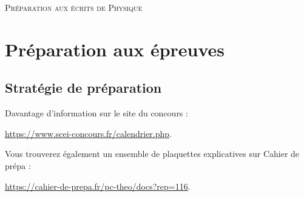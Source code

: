 \documentclass[12pt,fancy]{cours}
\begin{document}
\begin{center}
  \Large
  \color{structurecolor}
  \textsc{Préparation aux écrits de Physique}
\end{center}

%

\section{Préparation aux épreuves}

\subsection{Stratégie de préparation}

Davantage d'information sur le site du concours : 
\begin{center}
  \href{https://www.scei-concours.fr/calendrier.php}{https://www.scei-concours.fr/calendrier.php}.
\end{center}
Vous trouverez également un ensemble de plaquettes explicatives sur Cahier de prépa :
\begin{center}
  \href{https://cahier-de-prepa.fr/pc-theo/docs?rep=116}{https://cahier-de-prepa.fr/pc-theo/docs?rep=116}.
\end{center}
\end{document}
